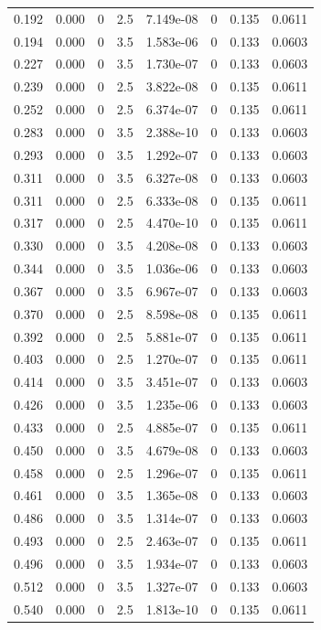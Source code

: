 \documentclass[preview]{standalone}
\begin{document}
{{\begin{tabular}{L{1.2cm}C{1.2cm} C{0.3cm}C{0.5cm} C{1.4cm}C{1.4cm} C{1.4cm}C{1.4cm}}
  0.192  &  0.000  & 0     & 2.5 &  7.149e-08  & 0  & 0.135 &  0.0611   \\ 
  0.194  &  0.000  & 0     & 3.5 &  1.583e-06  & 0  & 0.133 &  0.0603   \\ 
  0.227  &  0.000  & 0     & 3.5 &  1.730e-07  & 0  & 0.133 &  0.0603   \\ 
  0.239  &  0.000  & 0     & 2.5 &  3.822e-08  & 0  & 0.135 &  0.0611   \\ 
  0.252  &  0.000  & 0     & 2.5 &  6.374e-07  & 0  & 0.135 &  0.0611   \\ 
  0.283  &  0.000  & 0     & 3.5 &  2.388e-10  & 0  & 0.133 &  0.0603   \\ 
  0.293  &  0.000  & 0     & 3.5 &  1.292e-07  & 0  & 0.133 &  0.0603   \\ 
  0.311  &  0.000  & 0     & 3.5 &  6.327e-08  & 0  & 0.133 &  0.0603   \\ 
  0.311  &  0.000  & 0     & 2.5 &  6.333e-08  & 0  & 0.135 &  0.0611   \\ 
  0.317  &  0.000  & 0     & 2.5 &  4.470e-10  & 0  & 0.135 &  0.0611   \\ 
  0.330  &  0.000  & 0     & 3.5 &  4.208e-08  & 0  & 0.133 &  0.0603   \\ 
  0.344  &  0.000  & 0     & 3.5 &  1.036e-06  & 0  & 0.133 &  0.0603   \\ 
  0.367  &  0.000  & 0     & 3.5 &  6.967e-07  & 0  & 0.133 &  0.0603   \\ 
  0.370  &  0.000  & 0     & 2.5 &  8.598e-08  & 0  & 0.135 &  0.0611   \\ 
  0.392  &  0.000  & 0     & 2.5 &  5.881e-07  & 0  & 0.135 &  0.0611   \\ 
  0.403  &  0.000  & 0     & 2.5 &  1.270e-07  & 0  & 0.135 &  0.0611   \\ 
  0.414  &  0.000  & 0     & 3.5 &  3.451e-07  & 0  & 0.133 &  0.0603   \\ 
  0.426  &  0.000  & 0     & 3.5 &  1.235e-06  & 0  & 0.133 &  0.0603   \\ 
  0.433  &  0.000  & 0     & 2.5 &  4.885e-07  & 0  & 0.135 &  0.0611   \\ 
  0.450  &  0.000  & 0     & 3.5 &  4.679e-08  & 0  & 0.133 &  0.0603   \\ 
  0.458  &  0.000  & 0     & 2.5 &  1.296e-07  & 0  & 0.135 &  0.0611   \\ 
  0.461  &  0.000  & 0     & 3.5 &  1.365e-08  & 0  & 0.133 &  0.0603   \\ 
  0.486  &  0.000  & 0     & 3.5 &  1.314e-07  & 0  & 0.133 &  0.0603   \\ 
  0.493  &  0.000  & 0     & 2.5 &  2.463e-07  & 0  & 0.135 &  0.0611   \\ 
  0.496  &  0.000  & 0     & 3.5 &  1.934e-07  & 0  & 0.133 &  0.0603   \\ 
  0.512  &  0.000  & 0     & 3.5 &  1.327e-07  & 0  & 0.133 &  0.0603   \\ 
  0.540  &  0.000  & 0     & 2.5 &  1.813e-10  & 0  & 0.135 &  0.0611   \\ 
\hline 
\end{tabular} 

}}
\end{document}
